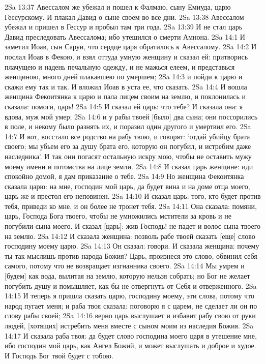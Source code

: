 2Sa 13:37  Авессалом же убежал и пошел к Фалмаю, сыну Емиуда, царю Гессурскому. И плакал Давид о сыне своем во все дни.
2Sa 13:38  Авессалом убежал и пришел в Гессур и пробыл там три года.
2Sa 13:39  И не стал царь Давид преследовать Авессалома; ибо утешился о смерти Амнона.
2Sa 14:1  И заметил Иоав, сын Саруи, что сердце царя обратилось к Авессалому.
2Sa 14:2  И послал Иоав в Фекою, и взял оттуда умную женщину и сказал ей: притворись плачущею и надень печальную одежду, и не мажься елеем, и представься женщиною, много дней плакавшею по умершем;
2Sa 14:3  и пойди к царю и скажи ему так и так. И вложил Иоав в уста ее, что сказать.
2Sa 14:4  И вошла женщина Фекоитянка к царю и пала лицем своим на землю, и поклонилась и сказала: помоги, царь!
2Sa 14:5  И сказал ей царь: что тебе? И сказала она: я вдова, муж мой умер;
2Sa 14:6  и у рабы твоей [было] два сына; они поссорились в поле, и некому было разнять их, и поразил один другого и умертвил его.
2Sa 14:7  И вот, восстало все родство на рабу твою, и говорят: `отдай убийцу брата своего; мы убьем его за душу брата его, которую он погубил, и истребим даже наследника'. И так они погасят остальную искру мою, чтобы не оставить мужу моему имени и потомства на лице земли.
2Sa 14:8  И сказал царь женщине: иди спокойно домой, я дам приказание о тебе.
2Sa 14:9  Но женщина Фекоитянка сказала царю: на мне, господин мой царь, да будет вина и на доме отца моего, царь же и престол его неповинен.
2Sa 14:10  И сказал царь: того, кто будет против тебя, приведи ко мне, и он более не тронет тебя.
2Sa 14:11  Она сказала: помяни, царь, Господа Бога твоего, чтобы не умножились мстители за кровь и не погубили сына моего. И сказал [царь]: жив Господь! не падет и волос сына твоего на землю.
2Sa 14:12  И сказала женщина: позволь рабе твоей сказать [еще] слово господину моему царю.
2Sa 14:13  Он сказал: говори. И сказала женщина: почему ты так мыслишь против народа Божия? Царь, произнеся это слово, обвинил себя самого, потому что не возвращает изгнанника своего.
2Sa 14:14  Мы умрем и [будем] как вода, вылитая на землю, которую нельзя собрать; но Бог не желает погубить душу и помышляет, как бы не отвергнуть от Себя и отверженного.
2Sa 14:15  И теперь я пришла сказать царю, господину моему, эти слова, потому что народ пугает меня; и раба твоя сказала: поговорю я с царем, не сделает ли он по слову рабы своей;
2Sa 14:16  верно царь выслушает и избавит рабу свою от руки людей, [хотящих] истребить меня вместе с сыном моим из наследия Божия.
2Sa 14:17  И сказала раба твоя: да будет слово господина моего царя в утешение мне, ибо господин мой царь, как Ангел Божий, и может выслушать и доброе и худое. И Господь Бог твой будет с тобою.
